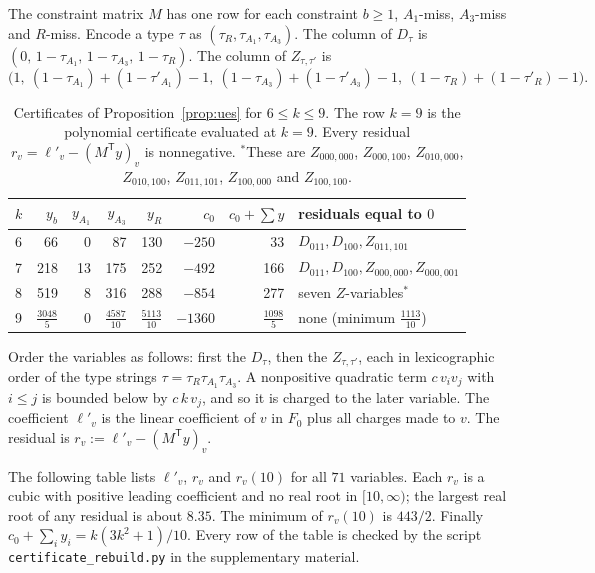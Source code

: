 \documentclass[11pt]{amsart}
\theoremstyle{definition}
\theoremstyle{remark}
\newcommand{\1}{\mathbf 1}
\begin{document}
The constraint matrix $M$ has one row for each constraint $b\ge1$, $A_1$-miss, $A_3$-miss and $R$-miss.
Encode a type $\tau$ as $(\tau_R,\tau_{A_1},\tau_{A_3})$. The column of $D_\tau$ is
$(0,\,1-\tau_{A_1},\,1-\tau_{A_3},\,1-\tau_R)$. The column of $Z_{\tau,\tau'}$ is
\[
\bigl(1,\ (1-\tau_{A_1})+(1-\tau'_{A_1})-1,\ (1-\tau_{A_3})+(1-\tau'_{A_3})-1,\ (1-\tau_R)+(1-\tau'_R)-1\bigr).
\]
\begin{table}[ht]\centering\small
\begin{tabular}{@{}lrrrrrrl@{}}
\toprule
$k$ & $y_b$ & $y_{A_1}$ & $y_{A_3}$ & $y_R$ & $c_0$ & $c_0+\sum y$ & residuals equal to $0$\\
\midrule
6 & 66 & 0 & 87 & 130 & $-250$ & 33 & $D_{011},D_{100},Z_{011,101}$\\
7 & 218 & 13 & 175 & 252 & $-492$ & 166 & $D_{011},D_{100},Z_{000,000},Z_{000,001}$\\
8 & 519 & 8 & 316 & 288 & $-854$ & 277 & seven $Z$-variables$^{*}$\\
9 & $\tfrac{3048}{5}$ & 0 & $\tfrac{4587}{10}$ & $\tfrac{5113}{10}$ & $-1360$ & $\tfrac{1098}{5}$ & none (minimum $\tfrac{1113}{10}$)\\
\bottomrule
\end{tabular}
\caption{Certificates of Proposition~\ref{prop:ues} for $6\le k\le 9$. The row $k=9$ is the polynomial
certificate evaluated at $k=9$. Every residual $r_v=\ell'_v-(M^{\mathsf T}y)_v$ is nonnegative.
$^{*}$These are $Z_{000,000}$, $Z_{000,100}$, $Z_{010,000}$, $Z_{010,100}$, $Z_{011,101}$, $Z_{100,000}$ and $Z_{100,100}$.}
\label{tab:fixedk}
\end{table}

Order the variables as follows: first the $D_\tau$, then the $Z_{\tau,\tau'}$, each in lexicographic
order of the type strings $\tau=\tau_R\tau_{A_1}\tau_{A_3}$. A nonpositive quadratic term
$c\,v_iv_j$ with $i\le j$ is bounded below by $c\,k\,v_j$, and so it is charged to the later variable. The
coefficient $\ell'_v$ is the linear coefficient of $v$ in $F_0$ plus all charges made to $v$. The residual
is $r_v:=\ell'_v-(M^{\mathsf T}y)_v$.

The following table lists $\ell'_v$, $r_v$ and $r_v(10)$ for all $71$ variables. Each $r_v$ is a cubic
with positive leading coefficient and no real root in $[10,\infty)$; the largest real root of any
residual is about $8.35$. The minimum of $r_v(10)$ is $443/2$. Finally
$c_0+\sum_i y_i=k(3k^2+1)/10$. Every row of the table is checked by the script
\texttt{certificate\_rebuild.py} in the supplementary material.
\end{document}
